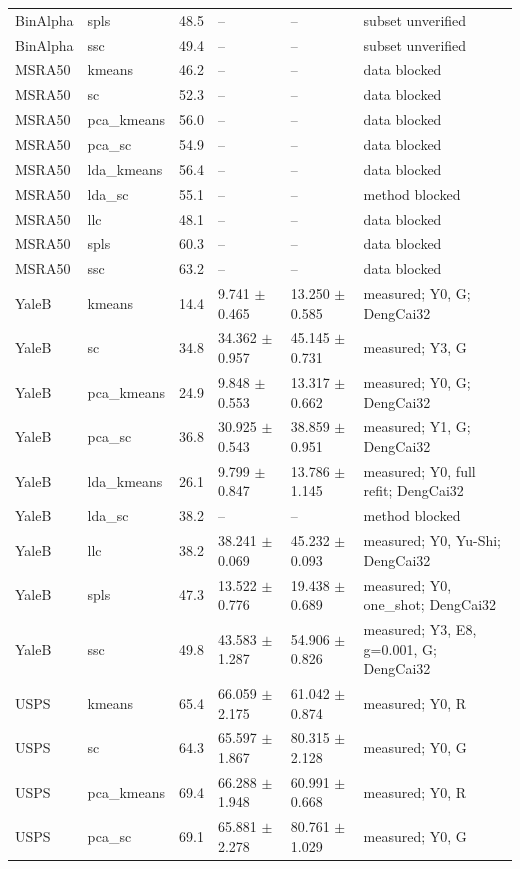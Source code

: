 \begin{longtable}{llrllp{2.9cm}}
BinAlpha & spls & 48.5 & -- & -- & subset unverified \\
BinAlpha & ssc & 49.4 & -- & -- & subset unverified \\
MSRA50 & kmeans & 46.2 & -- & -- & data blocked \\
MSRA50 & sc & 52.3 & -- & -- & data blocked \\
MSRA50 & pca\_kmeans & 56.0 & -- & -- & data blocked \\
MSRA50 & pca\_sc & 54.9 & -- & -- & data blocked \\
MSRA50 & lda\_kmeans & 56.4 & -- & -- & data blocked \\
MSRA50 & lda\_sc & 55.1 & -- & -- & method blocked \\
MSRA50 & llc & 48.1 & -- & -- & data blocked \\
MSRA50 & spls & 60.3 & -- & -- & data blocked \\
MSRA50 & ssc & 63.2 & -- & -- & data blocked \\
YaleB & kmeans & 14.4 & 9.741 $\pm$ 0.465 & 13.250 $\pm$ 0.585 & measured; Y0, G; DengCai32 \\
YaleB & sc & 34.8 & 34.362 $\pm$ 0.957 & 45.145 $\pm$ 0.731 & measured; Y3, G \\
YaleB & pca\_kmeans & 24.9 & 9.848 $\pm$ 0.553 & 13.317 $\pm$ 0.662 & measured; Y0, G; DengCai32 \\
YaleB & pca\_sc & 36.8 & 30.925 $\pm$ 0.543 & 38.859 $\pm$ 0.951 & measured; Y1, G; DengCai32 \\
YaleB & lda\_kmeans & 26.1 & 9.799 $\pm$ 0.847 & 13.786 $\pm$ 1.145 & measured; Y0, full refit; DengCai32 \\
YaleB & lda\_sc & 38.2 & -- & -- & method blocked \\
YaleB & llc & 38.2 & 38.241 $\pm$ 0.069 & 45.232 $\pm$ 0.093 & measured; Y0, Yu-Shi; DengCai32 \\
YaleB & spls & 47.3 & 13.522 $\pm$ 0.776 & 19.438 $\pm$ 0.689 & measured; Y0, one\_shot; DengCai32 \\
YaleB & ssc & 49.8 & 43.583 $\pm$ 1.287 & 54.906 $\pm$ 0.826 & measured; Y3, E8, g=0.001, G; DengCai32 \\
USPS & kmeans & 65.4 & 66.059 $\pm$ 2.175 & 61.042 $\pm$ 0.874 & measured; Y0, R \\
USPS & sc & 64.3 & 65.597 $\pm$ 1.867 & 80.315 $\pm$ 2.128 & measured; Y0, G \\
USPS & pca\_kmeans & 69.4 & 66.288 $\pm$ 1.948 & 60.991 $\pm$ 0.668 & measured; Y0, R \\
USPS & pca\_sc & 69.1 & 65.881 $\pm$ 2.278 & 80.761 $\pm$ 1.029 & measured; Y0, G \\

\end{longtable}
